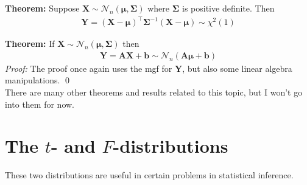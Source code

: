 \documentclass{book}
\theoremstyle{definition}
\newcommand{\X}{\mathbf{X}}
\newcommand{\Y}{\mathbf{Y}}
\begin{document}
\noindent\textbf{Theorem:} Suppose $\X \sim \mathcal{N}_n(\bm{\mu}, \mathbf{\Sigma})$ where $\mathbf{\Sigma}$ is positive definite. Then 
\begin{align}
\boxed{\Y = (\X - \bm{\mu})^\top \mathbf{\Sigma}^{-1}(\X - \bm{\mu}) \sim\chi^2(1)}
\end{align}

\noindent\textbf{Theorem:} If $\X \sim \mathcal{N}_n(\bm{\mu},\mathbf{\Sigma})$ then
\begin{align}
\boxed{\Y = \mathbf{A}\X + \mathbf{b} \sim \mathcal{N}_n(\mathbf{A}\bm{\mu} + \mathbf{b})}
\end{align}
\noindent \textit{Proof:} The proof once again uses the mgf for $\Y$, but also some linear algebra manipulations. \qed\\

There are many other theorems and results related to this topic, but I won't go into them for now. \\




\section{The $t$- and $F$-distributions}


These two distributions are useful in certain problems in statistical inference. 
\end{document}
